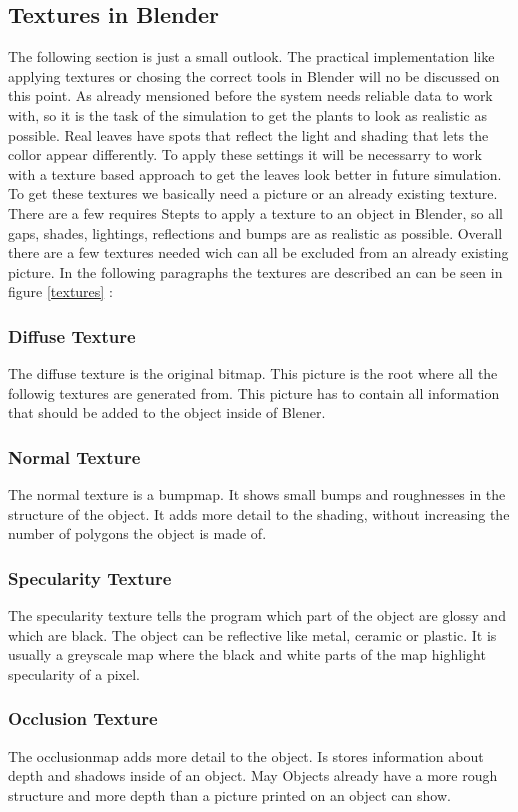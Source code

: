 \subsection{Textures in Blender}

The following section is just a small outlook. The practical implementation like applying textures or chosing the correct tools in Blender will no be discussed on this point.\newline
As already mensioned before the system needs reliable data to work with, so it is the task of the simulation to get the plants to look as realistic as possible. Real leaves have spots that reflect the light and shading that lets the collor appear differently. To apply these settings it will be necessarry to work with a texture based approach to get the leaves look better in future simulation. 
To get these textures we basically need a picture or an already existing texture. There are a few requires Stepts to apply a texture to an object in Blender, so all gaps, shades, lightings, reflections and bumps are as realistic as possible.
Overall there are a few textures needed wich can all be excluded from an already existing picture.
In the following paragraphs the textures are described an can be seen in figure \ref{textures} :
\subsubsection*{Diffuse Texture}
The diffuse texture is the original bitmap. This picture is the root where all the followig textures are generated from. This picture has to contain all information that should be added to the object inside of Blener.
\subsubsection*{Normal Texture}
The normal texture is a bumpmap. It shows small bumps and roughnesses in the structure of the object. It adds more detail to the shading, without increasing the number of polygons the object is made of. 
\subsubsection*{Specularity Texture}
The specularity texture tells the program which part of the object are glossy and which are black. The object can be reflective like metal, ceramic or plastic. It is usually a greyscale map where the black and white parts of the map highlight specularity of a pixel.
\subsubsection*{Occlusion Texture}
The occlusionmap adds more detail to the object. Is stores information about depth and shadows inside of an object. May Objects already have a more rough structure and more depth than a picture printed on an object can show.
